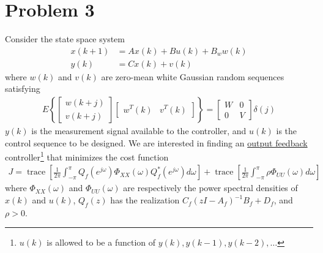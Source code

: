 \section*{Problem 3}

Consider the state space system
\begin{align*}
    x(k+1) & = Ax(k) + Bu(k) + B_w w(k) \\
    y(k) & = Cx(k) + v(k)
\end{align*}
where $w(k)$ and $v(k)$ are zero-mean white Gaussian random sequences satisfying
\begin{align*}
    E \left\{ \begin{bmatrix}
            w(k+j) \\
            v(k+j)
        \end{bmatrix} \begin{bmatrix}
            w^T(k) & v^T(k)
        \end{bmatrix} \right\} = \begin{bmatrix}
            W & 0 \\
            0 & V
        \end{bmatrix} \delta(j)
\end{align*}
$y(k)$ is the measurement signal available to the controller, and $u(k)$ is the control sequence to be designed. We are interested in finding an \underline{output feedback} controller\footnote{$u(k)$ is allowed to be a function of $y(k),y(k-1),y(k-2),\ldots$} that minimizes the cost function
\begin{align*}
    J = \operatorname{trace} \left[ \frac{1}{2\pi} \int_{-\pi}^\pi
        Q_f(e^{j\omega}) \Phi_{XX}(\omega) Q_f^*(e^{j\omega}) d\omega \right]
        + \operatorname{trace} \left[ \frac{1}{2\pi} \int_{-\pi}^\pi
        \rho \Phi_{UU}(\omega) d\omega \right]
\end{align*}
where $\Phi_{XX}(\omega)$ and $\Phi_{UU}(\omega)$ are respectively the power spectral densities of $x(k)$ and $u(k)$, $Q_f(z)$ has the realization $C_f (zI - A_f)^{-1} B_f + D_f$, and $\rho > 0$.

